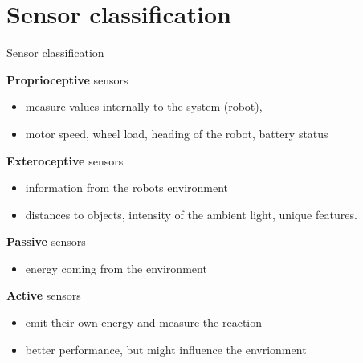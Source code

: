 \documentclass[compress]{beamer}
\begin{document}
\section{Sensor classification}\label{sensor-classification}

\begin{frame}{Sensor classification}

    \footnotesize
    \textbf{Proprioceptive} sensors

    \begin{itemize}

        \item
              measure values internally to the system (robot),
        \item
              \eg motor speed, wheel load, heading of the robot, battery status
    \end{itemize}

    \textbf{Exteroceptive} sensors

    \begin{itemize}

        \item
              information from the robots environment
        \item
              distances to objects, intensity of the ambient light, unique features.
    \end{itemize}

    \textbf{Passive} sensors

    \begin{itemize}

        \item
              energy coming from the environment
    \end{itemize}

    \textbf{Active} sensors

    \begin{itemize}

        \item
              emit their own energy and measure the reaction
        \item
              better performance, but might influence the envrionment
    \end{itemize}

\end{frame}
\end{document}

